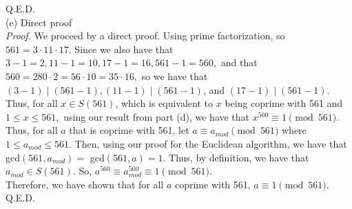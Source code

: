 \documentclass{article}
\begin{document}
Q.E.D. \\[.5cm]
(e) Direct proof \\[.3cm]
\textit{Proof.} We proceed by a direct proof. Using prime factorization, so $561 = 3\cdot11\cdot17.$ Since we also have that $3 - 1 = 2, 11 - 1 = 10, 17 - 1 = 16, 561 - 1 = 560,$ and that $560 = 280\cdot2 = 56\cdot10 = 35\cdot16,$ so we have that $(3-1)\mid(561-1), (11-1)\mid(561-1)$, and $(17-1)\mid(561-1)$. \\[.1cm]
Thus, for all $x\in S(561)$, which is equivalent to $x$ being coprime with 561 and $1\leq x\leq561,$ using our result from part (d), we have that $x^{560}\equiv1\pmod{561}.$ \\[.1cm]
Thus, for all $a$ that is coprime with 561, let $a\equiv a_{mod}\pmod{561}$ where $1\leq a_{mod}\leq561.$ Then, using our proof for the Euclidean algorithm, we have that gcd$(561, a_{mod}) = $ gcd$(561, a) = 1.$ Thus, by definition, we have that $a_{mod}\in S(561).$ So, $a^{560}\equiv a_{mod}^{560}\equiv1\pmod{561}.$ \\[.1cm]
Therefore, we have shown that for all $a$ coprime with 561, $a\equiv1\pmod{561}.$ \\[.1cm]
Q.E.D.
\end{document}
